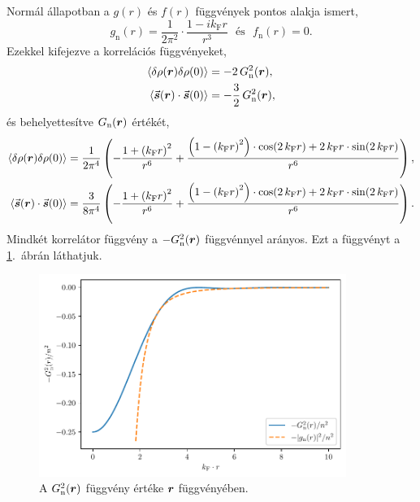 \documentclass[a4paper,12pt,titlepage]{article}
\newcommand{\RR}{{\vb*{r}}}
\newcommand{\kF}{{k_\text{F}}}
\begin{document}
Normál állapotban a $g(r)$ és $f(r)$ függvények pontos alakja ismert,
\begin{equation}
	g_\text{n}(r) = \frac{1}{2 \pi^2} \cdot \frac{1 - i \kF r}{r^3} ~~~ \text{és} ~~~ f_\text{n}(r) = 0.
\end{equation}
Ezekkel kifejezve a korrelációs függvényeket,
\begin{equation}
\begin{split}
	\expval{\delta\rho(\RR) \delta\rho(0)} & = -2 \, G_\text{n}^2(\RR), \\
	\expval{\va*{s}(\RR) \cdot \va*{s}(0)} & = -\frac{3}{2} \, G_\text{n}^2(\RR),
\end{split}
\end{equation}
és behelyettesítve $G_\text{n}(\RR)$ értékét,
\begin{equation}
\begin{split}
	\expval{\delta\rho(\RR) \delta\rho(0)} & = \frac{1}{2 \pi^4} \left( -\frac{1 + \left( \kF r \right)^2}{r^6} + \frac{\left( 1 - \left( \kF r \right)^2 \right) \cdot \cos(2 \, \kF r) + 2 \, \kF r \cdot \sin(2 \, \kF r)}{r^6} \right), \\
	\expval{\va*{s}(\RR) \cdot \va*{s}(0)} & = \frac{3}{8 \pi^4} \left( -\frac{1 + \left( \kF r \right)^2}{r^6} + \frac{\left( 1 - \left( \kF r \right)^2 \right) \cdot \cos(2 \, \kF r) + 2 \, \kF r \cdot \sin(2 \, \kF r)}{r^6} \right).
\end{split}
\end{equation}
Mindkét korrelátor függvény a $-G_\text{n}^2(\RR)$ függvénnyel arányos.  Ezt a függvényt a \ref{G2-normal-fig}.\ ábrán láthatjuk.

\begin{figure}[h!]
	\centering
	\includegraphics[width=10cm]{G2_normal.pdf}
	\caption{A $G_\text{n}^2(\RR)$ függvény értéke $\RR$ függvényében.}
	\label{G2-normal-fig}
\end{figure}
\end{document}
